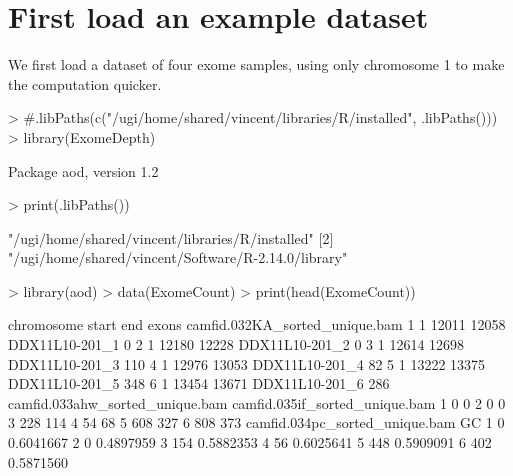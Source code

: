 \documentclass[10pt]{article}
\begin{document}
\section{First load an example dataset}
We first load a dataset of four exome samples, using only chromosome 1 to make the computation quicker.
\begin{Schunk}
\begin{Sinput}
> #.libPaths(c("/ugi/home/shared/vincent/libraries/R/installed", .libPaths()))
> library(ExomeDepth) 
\end{Sinput}
\begin{Soutput}
Package aod, version 1.2 
\end{Soutput}
\begin{Sinput}
> print(.libPaths())
\end{Sinput}
\begin{Soutput}
[1] "/ugi/home/shared/vincent/libraries/R/installed"    
[2] "/ugi/home/shared/vincent/Software/R-2.14.0/library"
\end{Soutput}
\begin{Sinput}
> library(aod)
> data(ExomeCount)
> print(head(ExomeCount))
\end{Sinput}
\begin{Soutput}
  chromosome start   end          exons camfid.032KA_sorted_unique.bam
1          1 12011 12058 DDX11L10-201_1                              0
2          1 12180 12228 DDX11L10-201_2                              0
3          1 12614 12698 DDX11L10-201_3                            110
4          1 12976 13053 DDX11L10-201_4                             82
5          1 13222 13375 DDX11L10-201_5                            348
6          1 13454 13671 DDX11L10-201_6                            286
  camfid.033ahw_sorted_unique.bam camfid.035if_sorted_unique.bam
1                               0                              0
2                               0                              0
3                             228                            114
4                              54                             68
5                             608                            327
6                             808                            373
  camfid.034pc_sorted_unique.bam        GC
1                              0 0.6041667
2                              0 0.4897959
3                            154 0.5882353
4                             56 0.6025641
5                            448 0.5909091
6                            402 0.5871560
\end{Soutput}
\end{Schunk}
\end{document}
